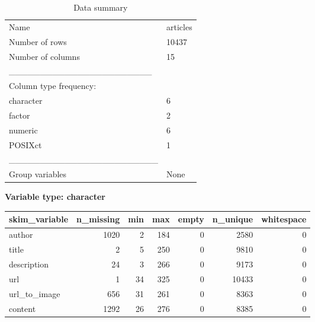 \documentclass[
]{article}
\newenvironment{Shaded}{\begin{snugshade}}{\end{snugshade}}
\newcommand{\FunctionTok}[1]{\textcolor[rgb]{0.00,0.00,0.00}{#1}}
\newcommand{\NormalTok}[1]{#1}
\newcommand{\OtherTok}[1]{\textcolor[rgb]{0.56,0.35,0.01}{#1}}
\newcommand{\SpecialCharTok}[1]{\textcolor[rgb]{0.00,0.00,0.00}{#1}}
\newcommand{\StringTok}[1]{\textcolor[rgb]{0.31,0.60,0.02}{#1}}
\begin{document}
\begin{Shaded}
\end{Shaded}

\begin{longtable}[]{@{}ll@{}}
\caption{Data summary}\tabularnewline
\toprule
\endhead
Name & articles \\
Number of rows & 10437 \\
Number of columns & 15 \\
\_\_\_\_\_\_\_\_\_\_\_\_\_\_\_\_\_\_\_\_\_\_\_ & \\
Column type frequency: & \\
character & 6 \\
factor & 2 \\
numeric & 6 \\
POSIXct & 1 \\
\_\_\_\_\_\_\_\_\_\_\_\_\_\_\_\_\_\_\_\_\_\_\_\_ & \\
Group variables & None \\
\bottomrule
\end{longtable}

\textbf{Variable type: character}

\begin{longtable}[]{@{}lrrrrrr@{}}
\toprule
skim\_variable & n\_missing & min & max & empty & n\_unique &
whitespace \\
\midrule
\endhead
author & 1020 & 2 & 184 & 0 & 2580 & 0 \\
title & 2 & 5 & 250 & 0 & 9810 & 0 \\
description & 24 & 3 & 266 & 0 & 9173 & 0 \\
url & 1 & 34 & 325 & 0 & 10433 & 0 \\
url\_to\_image & 656 & 31 & 261 & 0 & 8363 & 0 \\
content & 1292 & 26 & 276 & 0 & 8385 & 0 \\
\bottomrule
\end{longtable}
\end{document}
